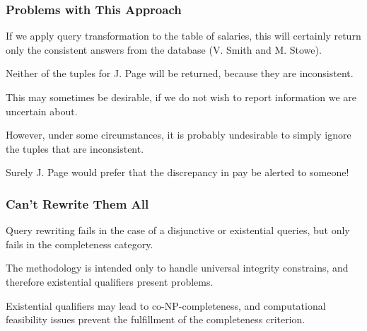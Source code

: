 \begin{frame}
\frametitle{Problems with This Approach}

If we apply query transformation to the table of salaries, this will certainly return only the consistent answers from the database (V. Smith and M. Stowe). 

Neither of the tuples for J. Page will be returned, because they are inconsistent. 

This may sometimes be desirable, if we do not wish to report information we are uncertain about. 

However, under some circumstances, it is probably undesirable to simply ignore the tuples that are inconsistent. 

Surely J. Page would prefer that the discrepancy in pay be alerted to someone!


\end{frame}

\begin{frame}
\frametitle{Can't Rewrite Them All}

Query rewriting fails in the case of a disjunctive or existential queries, but only fails in the completeness category. 

The methodology is intended only to handle universal integrity constrains, and therefore existential qualifiers present problems. 

Existential qualifiers may lead to co-NP-completeness, and computational feasibility issues prevent the fulfillment of the completeness criterion. 


\end{frame}




















